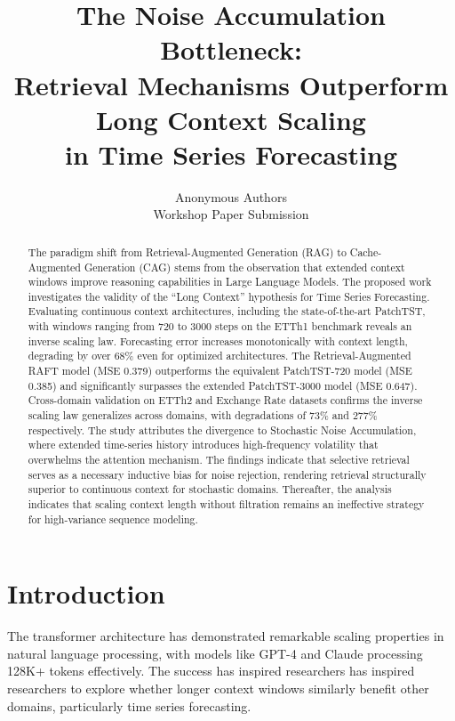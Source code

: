 \documentclass[10pt,twocolumn,letterpaper]{article}
\title{\LARGE \bf
The Noise Accumulation Bottleneck:\\
Retrieval Mechanisms Outperform Long Context Scaling\\
in Time Series Forecasting
}
\author{
Anonymous Authors\\
Workshop Paper Submission\\
}
\begin{document}
\maketitle
\thispagestyle{empty}

\begin{abstract}
The paradigm shift from Retrieval-Augmented Generation (RAG) to Cache-Augmented Generation (CAG) stems from the observation that extended context windows improve reasoning capabilities in Large Language Models. The proposed work investigates the validity of the ``Long Context'' hypothesis for Time Series Forecasting. Evaluating continuous context architectures, including the state-of-the-art PatchTST, with windows ranging from 720 to 3000 steps on the ETTh1 benchmark reveals an inverse scaling law. Forecasting error increases monotonically with context length, degrading by over 68\% even for optimized architectures. The Retrieval-Augmented RAFT model (MSE 0.379) outperforms the equivalent PatchTST-720 model (MSE 0.385) and significantly surpasses the extended PatchTST-3000 model (MSE 0.647). Cross-domain validation on ETTh2 and Exchange Rate datasets confirms the inverse scaling law generalizes across domains, with degradations of 73\% and 277\% respectively. The study attributes the divergence to Stochastic Noise Accumulation, where extended time-series history introduces high-frequency volatility that overwhelms the attention mechanism. The findings indicate that selective retrieval serves as a necessary inductive bias for noise rejection, rendering retrieval structurally superior to continuous context for stochastic domains. Thereafter, the analysis indicates that scaling context length without filtration remains an ineffective strategy for high-variance sequence modeling.
\end{abstract}

\section{Introduction}

The transformer architecture has demonstrated remarkable scaling properties in natural language processing, with models like GPT-4 and Claude processing 128K+ tokens effectively. The success has inspired researchers has inspired researchers to explore whether longer context windows similarly benefit other domains, particularly time series forecasting.
\end{document}
